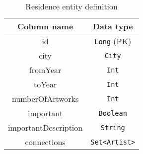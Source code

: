 \begin{table}[ht]
    \begin{center}
        \begin{tabular}{|c|c|}
            \hline
            Column name & Data type\\ \hline\hline
            id & \texttt{Long} (PK) \\\hline
            city & \texttt{City} \\\hline
            fromYear & \texttt{Int} \\\hline
            toYear & \texttt{Int} \\\hline
            numberOfArtworks & \texttt{Int} \\\hline
            important & \texttt{Boolean} \\\hline
            importantDescription & \texttt{String} \\\hline
            connections & \texttt{Set<Artist>} \\\hline
        \end{tabular}
    \end{center}
    \caption{Residence entity definition}
    \label{tab:residence-entity}
\end{table}